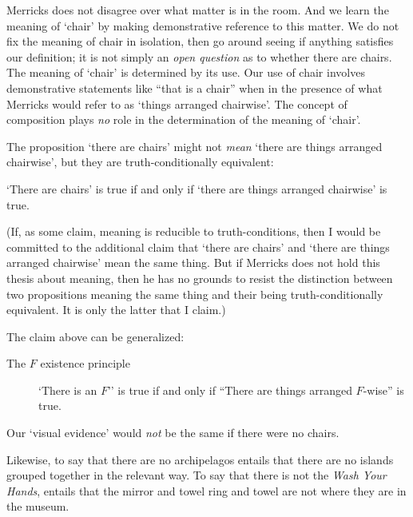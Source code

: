 \documentclass[11pt]{article}
\newenvironment{squote}{%
\begin{spacing}{1}
       	\begin{list}{}{%
\setlength{\labelwidth}{0pt}%
\rightmargin\leftmargin%
}
\item\relax
}{%
\end{list}%
\end{spacing}
}
\begin{document}
\begin{spacing}{1.25}


Merricks does not disagree over what matter is in the room.  And we
learn the meaning of `chair' by making demonstrative reference to this
matter.  We do not fix the meaning of chair in isolation, then go
around seeing if anything satisfies our definition; it is not simply
an {\em open question} as to whether there are chairs.  The meaning of
`chair' is determined by its use.  Our use of chair involves
demonstrative statements like ``that is a chair'' when in the presence
of what Merricks would refer to as `things arranged chairwise'.  The
concept of composition plays {\em no} role in the determination of the
meaning of `chair'.

The proposition `there are chairs' might not {\em mean} `there are
things arranged chairwise', but they are truth-conditionally
equivalent:

\begin{squote}
`There are chairs' is true if and only if `there are things arranged
  chairwise' is true.
\end{squote}

(If, as some claim, meaning is reducible to truth-conditions, then I
would be committed to the additional claim that `there are chairs' and
`there are things arranged chairwise' mean the same thing.  But if
Merricks does not hold this thesis about meaning, then he has no
grounds to resist the distinction between two propositions meaning the
same thing and their being truth-conditionally equivalent.  It is only
the latter that I claim.)

The claim above can be generalized:

\begin{description}
  \item[The $F$ existence principle] `There is an $F$'' is true if
    and only if ``There are things arranged $F$-wise'' is
    true. \label{fwise}
\end{description}

Our `visual evidence' would {\em not} be the same if there were no
chairs.


Likewise, to say that there are no archipelagos entails that there are
no islands grouped together in the relevant way.  To say that there is
not the {\em Wash Your Hands}, entails that the mirror and towel ring
and towel are not where they are in the museum.


\end{spacing}
\end{document}

